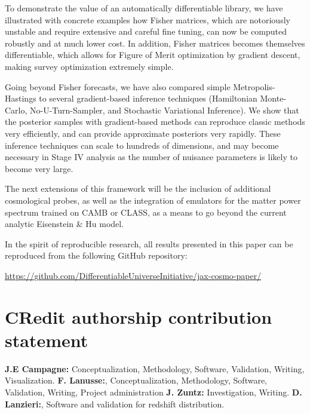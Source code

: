 \documentclass[twocolumn,twocolappendix,nofootinbib,iop]{openjournal}
\begin{document}
To demonstrate the value of an automatically differentiable library, we have illustrated with concrete examples how Fisher matrices, which are notoriously unstable and require extensive and careful fine tuning, can now be computed robustly and at much lower cost. In addition, Fisher matrices becomes themselves differentiable, which allows for  Figure of Merit optimization by gradient descent, making survey optimization extremely simple. 

Going beyond Fisher forecasts, we have also compared simple Metropolis-Hastings to several gradient-based inference techniques (Hamiltonian Monte-Carlo, No-U-Turn-Sampler, and Stochastic Variational Inference). We show that the posterior samples with gradient-based methods can reproduce classic methods very efficiently, and can provide approximate posteriors very rapidly. These inference techniques can scale to hundreds of dimensions, and may become necessary in Stage IV analysis as the number of nuisance parameters is likely to become very large.

The next extensions of this framework will be the inclusion of additional cosmological probes, as well as the integration of emulators for the matter power spectrum trained on CAMB or CLASS, as a means to go beyond the current analytic Eisenstein \& Hu model.

In the spirit of reproducible research, all results presented in this paper can be reproduced from the following GitHub repository:

\url{https://github.com/DifferentiableUniverseInitiative/jax-cosmo-paper/}



\section*{CRedit authorship contribution statement}
\textbf{J.E Campagne:} Conceptualization, Methodology, Software, Validation, Writing, Visualization.
\textbf{F. Lanusse:}, Conceptualization, Methodology, Software, Validation, Writing, Project administration \textbf{J. Zuntz:} Investigation, Writing.
\textbf{D. Lanzieri:}, Software and validation for redshift distribution.

\end{document}
